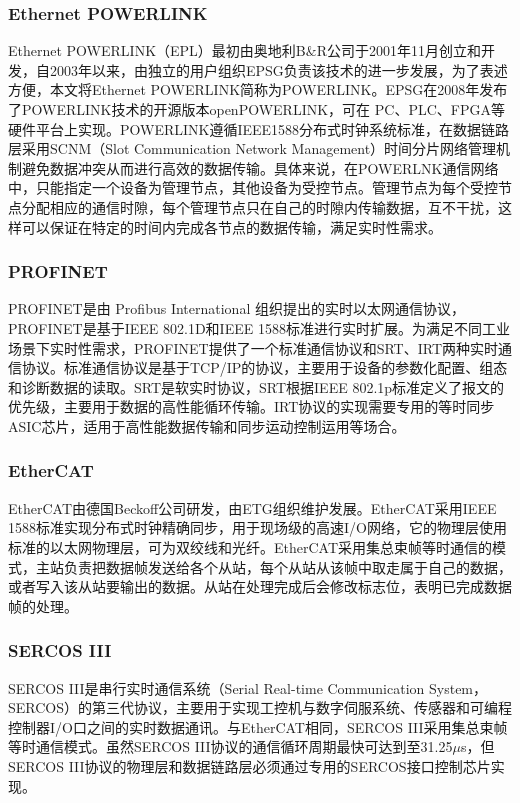 \subsubsection{Ethernet POWERLINK}
Ethernet POWERLINK（EPL）最初由奥地利B$\&$R公司于2001年11月创立和开发，自2003年以来，由独立的用户组织EPSG负责该技术的进一步发展\cite{ESPG}，为了表述方便，本文将Ethernet POWERLINK简称为POWERLINK。EPSG在2008年发布了POWERLINK技术的开源版本openPOWERLINK，可在 PC、PLC、FPGA等硬件平台上实现\cite{oplk}。POWERLINK遵循IEEE1588分布式时钟系统标准，在数据链路层采用SCNM（Slot Communication Network Management）时间分片网络管理机制避免数据冲突从而进行高效的数据传输。具体来说，在POWERLNK通信网络中，只能指定一个设备为管理节点，其他设备为受控节点。管理节点为每个受控节点分配相应的通信时隙，每个管理节点只在自己的时隙内传输数据，互不干扰，这样可以保证在特定的时间内完成各节点的数据传输，满足实时性需求。

\subsubsection{PROFINET}
PROFINET是由 Profibus International 组织提出的实时以太网通信协议，PROFINET是基于IEEE 802.1D和IEEE 1588标准进行实时扩展\cite{Feld2005}。为满足不同工业场景下实时性需求，PROFINET提供了一个标准通信协议和SRT、IRT两种实时通信协议。标准通信协议是基于TCP/IP的协议，主要用于设备的参数化配置、组态和诊断数据的读取。SRT是软实时协议，SRT根据IEEE 802.1p标准定义了报文的优先级，主要用于数据的高性能循环传输。IRT协议的实现需要专用的等时同步ASIC芯片，适用于高性能数据传输和同步运动控制运用等场合。

\subsubsection{EtherCAT}
EtherCAT由德国Beckoff公司研发，由ETG组织维护发展。EtherCAT采用IEEE 1588标准实现分布式时钟精确同步，用于现场级的高速I/O网络，它的物理层使用标准的以太网物理层，可为双绞线和光纤\cite{Wang2011}。EtherCAT采用集总束帧等时通信的模式，主站负责把数据帧发送给各个从站，每个从站从该帧中取走属于自己的数据，或者写入该从站要输出的数据。从站在处理完成后会修改标志位，表明已完成数据帧的处理。

\subsubsection{SERCOS III}
SERCOS III是串行实时通信系统（Serial Real-time Communication System，SERCOS）的第三代协议，主要用于实现工控机与数字伺服系统、传感器和可编程控制器I/O口之间的实时数据通讯\cite{Wang2017}。与EtherCAT相同，SERCOS III采用集总束帧等时通信模式。虽然SERCOS III协议的通信循环周期最快可达到至31.25$\mu$s，但SERCOS III协议的物理层和数据链路层必须通过专用的SERCOS接口控制芯片实现。

